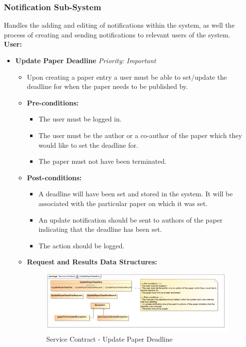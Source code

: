 \documentclass{article}
\begin{document}
				\cleardoublepage
			\subsubsection{Notification Sub-System}\label{subsubsec:notification}
				Handles the adding and editing of notifications within the system, as well the process of creating and sending notifications to relevant users of the system.\\
				[3mm]
				\textbf{User:}
				\begin{itemize}
					\item \textbf{Update Paper Deadline} \hfill \textit{Priority: Important}
					\begin{itemize}
						\item Upon creating a paper entry a user must be able to set/update the deadline for when the paper needs to be published by.
						\item \textbf{Pre-conditions:}
						\begin{itemize}
							\item The user must be logged in.
							\item The user must be the author or a co-author of the paper which they would like to set the deadline for.
							\item The paper must not have been terminated.
						\end{itemize}
						\item \textbf{Post-conditions:}
						\begin{itemize}
							\item A deadline will have been set and stored in the system. It will be associated with the particular paper on which it was set.
							\item An update notification should be sent to authors of the paper indicating that the deadline has been set.
							\item The action should be logged.
						\end{itemize}
						\item \textbf{Request and Results Data Structures:}
						\begin{figure}[H]
							\includegraphics[width=\linewidth]{../Diagrams/ServiceContracts/Notification subsystem/UpdatePaperDeadline.jpg}
							\caption{Service Contract - Update Paper Deadline}
						\end{figure}
					\end{itemize}	
					

\end{itemize}
\end{document}
